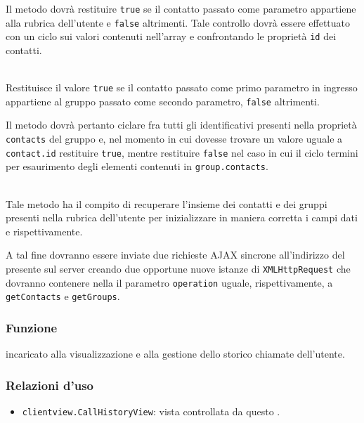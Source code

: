 \begin{description}
\item{}
Il metodo dovrà restituire \verb'true' se il contatto passato come parametro appartiene alla rubrica dell'utente e \verb'false' altrimenti. Tale controllo dovrà essere effettuato con un ciclo sui valori contenuti nell'array  e confrontando le proprietà \verb'id' dei contatti.

\item{}\\
Restituisce il valore \verb'true' se il contatto passato come primo parametro in ingresso appartiene al gruppo passato come secondo parametro, \verb'false' altrimenti.

Il metodo dovrà pertanto ciclare fra tutti gli identificativi presenti nella proprietà \verb'contacts' del gruppo e, nel momento in cui dovesse trovare un valore uguale a \verb'contact.id' restituire \verb'true', mentre restituire \verb'false' nel caso in cui il ciclo termini per esaurimento degli elementi contenuti in \verb'group.contacts'.

\item{}\\
Tale metodo ha il compito di recuperare l'insieme dei contatti e dei gruppi presenti nella rubrica dell'utente per inizializzare in maniera corretta i campi dati  e  rispettivamente.
  
  A tal fine dovranno essere inviate due richieste AJAX sincrone all'indirizzo del  presente sul server creando due opportune nuove istanze di \verb'XMLHttpRequest' che dovranno contenere nella  il parametro \verb'operation' uguale, rispettivamente, a \verb'getContacts' e \verb'getGroups'.

\end{description}



\subsubsection*{Funzione}
 incaricato alla visualizzazione e alla gestione dello storico chiamate dell'utente.

\subsubsection*{Relazioni d'uso}
\begin{itemize}
  \item \texttt{clientview.CallHistoryView}: vista controllata da questo .
\end{itemize}

